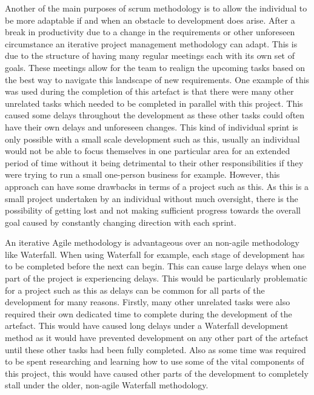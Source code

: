 \documentclass[11pt,a4paper]{report}
\begin{document}
Another of the main purposes of scrum methodology is to allow the individual to be more adaptable if and when an obstacle to development does arise\citep{Wiley_Project_Management}. After a break in productivity due to a change in the requirements or other unforeseen circumstance an iterative project management methodology can adapt. This is due to the structure of having many regular meetings each with its own set of goals. These meetings allow for the team to realign the upcoming tasks based on the best way to navigate this landscape of new requirements. One example of this was used during the completion of this artefact is that there were many other unrelated tasks which needed to be completed in parallel with this project. This caused some delays throughout the development as these other tasks could often have their own delays and unforeseen changes. This kind of individual sprint is only possible with a small scale development such as this, usually an individual would not be able to focus themselves in one particular area for an extended period of time without it being detrimental to their other responsibilities if they were trying to run a small one-person business for example. However, this approach can have some drawbacks in terms of a project such as this. As this is a small project undertaken by an individual without much oversight, there is the possibility of getting lost and not making sufficient progress towards the overall goal caused by constantly changing direction with each sprint.

An iterative Agile methodology is advantageous over an non-agile methodology like Waterfall. When using Waterfall for example, each stage of development has to be completed before the next can begin. This can cause large delays when one part of the project is experiencing delays. This would be particularly problematic for a project such as this as delays can be common for all parts of the development for many reasons. Firstly, many other unrelated tasks were also required their own dedicated time to complete during the development of the artefact. This would have caused long delays under a Waterfall development method as it would have prevented development on any other part of the artefact until these other tasks had been fully completed. Also as some time was required to be spent researching and learning how to use some of the vital components of this project, this would have caused other parts of the development to completely stall under the older, non-agile Waterfall methodology. 
\end{document}
